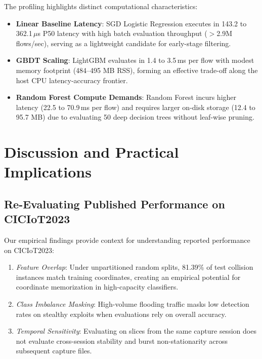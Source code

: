 \documentclass[conference,10pt,twocolumn]{IEEEtran}
\begin{document}
The profiling highlights distinct computational characteristics:
\begin{itemize}
    \item \textbf{Linear Baseline Latency}: SGD Logistic Regression executes in 143.2 to 362.1\,$\mu$s P50 latency with high batch evaluation throughput ($>$2.9M flows/sec), serving as a lightweight candidate for early-stage filtering.
    \item \textbf{GBDT Scaling}: LightGBM evaluates in 1.4 to 3.5\,ms per flow with modest memory footprint (484--495 MB RSS), forming an effective trade-off along the host CPU latency-accuracy frontier.
    \item \textbf{Random Forest Compute Demands}: Random Forest incurs higher latency (22.5 to 70.9\,ms per flow) and requires larger on-disk storage (12.4 to 95.7 MB) due to evaluating 50 deep decision trees without leaf-wise pruning.
\end{itemize}

\section{Discussion and Practical Implications}
\label{sec:discussion}

\subsection{Re-Evaluating Published Performance on CICIoT2023}
Our empirical findings provide context for understanding reported performance on CICIoT2023:
\begin{enumerate}
    \item \textit{Feature Overlap}: Under unpartitioned random splits, 81.39\% of test collision instances match training coordinates, creating an empirical potential for coordinate memorization in high-capacity classifiers.
    \item \textit{Class Imbalance Masking}: High-volume flooding traffic masks low detection rates on stealthy exploits when evaluations rely on overall accuracy.
    \item \textit{Temporal Sensitivity}: Evaluating on slices from the same capture session does not evaluate cross-session stability and burst non-stationarity across subsequent capture files.
\end{enumerate}
\end{document}
